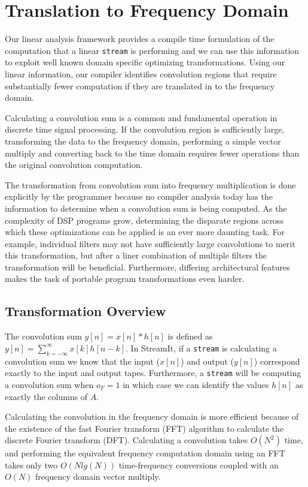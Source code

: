
\section{Translation to Frequency Domain}

Our linear analysis framework provides a compile time formulation of
the computation that a linear {\tt stream} is performing and we can
use this information to exploit well known domain specific optimizing
transformations.  Using our linear information, our compiler identifies
convolution regions that require substantially fewer computation if they 
are translated in to the frequency domain.

Calculating a convolution sum is a common and fundamental operation in
discrete time signal processing.
If the convolution region is sufficiently large, transforming the data to the
frequency domain, performing a simple vector multiply and converting
back to the time domain requires fewer operations than the original 
convolution computation.

The transformation from convolution sum into frequency multiplication
is done explicitly by the programmer because no compiler analysis today
has the information to determine when a convolution sum is being
computed.  As the complexity of DSP programs grow, determining the
disparate regions across which these optimizations can be applied is
an ever more daunting task. For example, individual filters may not
have sufficiently large convolutions to merit this transformation, but
after a liner combination of multiple filters the transformation will
be beneficial.  Furthermore, differing architectural features makes
the task of portable program transformations even harder.

\subsection{Transformation Overview}
The convolution sum $y[n]=x[n]*h[n]$ is defined 
as $y[n]=\sum_{k=-\infty}^{\infty}x[k]h[n-k]$.
In StreamIt, if a {\tt stream} is calculating a convolution sum we know that 
the input ($x[n]$) and output ($y[n]$) correspond exactly to the input and output tapes. 
Furthermore, a {\tt stream} will be computing a convolution sum when $o_F=1$ in which
case we can identify the values $h[n]$ as exactly the columns of $A$.

Calculating the convolution in the frequency domain is more efficient because of the 
existence of the fast Fourier transform (FFT) algorithm to calculate the discrete 
Fourier transform (DFT). Calculating a convolution takes $O(N^2)$ time, and performing 
the equivalent frequency computation domain using an FFT takes only two $O(N lg(N))$ 
time-frequency conversions coupled with an $O(N)$ frequency domain vector multiply.

